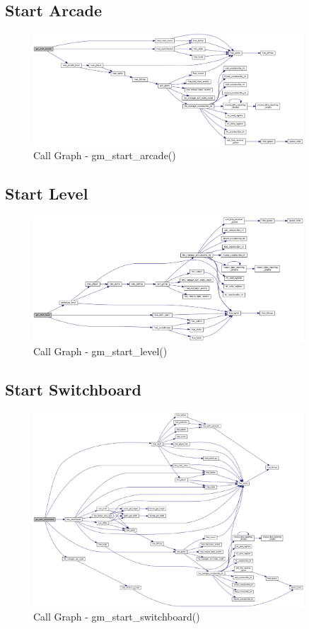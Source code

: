 \documentclass{report}
\begin{document}
\subsection{Start Arcade}

\begin{figure}[H]
	\centering
	\includegraphics[width=0.9\textwidth]{gm_start_arcade}
	\caption{Call Graph - gm\_start\_arcade()}
\end{figure}

\subsection{Start Level}

\begin{figure}[H]
	\centering
	\includegraphics[width=0.9\textwidth]{gm_start_level}
	\caption{Call Graph - gm\_start\_level()}
\end{figure}

\subsection{Start Switchboard}

\begin{figure}[H]
	\centering
	\includegraphics[width=0.9\textwidth]{gm_start_switchboard}
	\caption{Call Graph - gm\_start\_switchboard()}
\end{figure}
\end{document}
